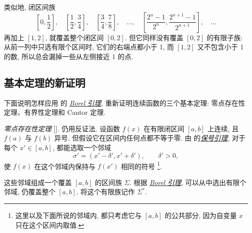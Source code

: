 类似地, 闭区间族
$$
\left[0,\frac12\right],\quad
\left[\frac12,\frac34\right],\quad
\left[\frac34,\frac78\right],\quad\ldots,\quad
\left[\frac{2^n-1}{2^n},\frac{2^{n+1}-1}{2^{n+1}}\right],\quad\ldots
$$
再加上 $[1,2]$, 就覆盖整个闭区间 $[0,2]$.
但它同样没有覆盖 $[0,2]$ 的有限子族:
从前一列中只选有限个区间时, 它们的右端点都小于 1,
而 $[1,2]$ 又不包含小于 1 的数, 所以总会漏掉一些从左侧接近 1 的点.

\subsection{基本定理的新证明}\label{subsec:89}
下面说明怎样应用  的 \hyperref[lem:borel_finite_cover]{\emph{Borel 引理}},
重新证明连续函数的三个基本定理: 零点存在性定理、有界性定理和 Cantor 定理.

\myrefparagraph{1\textdegree}\label{proof:borel_zero_existence}
\emph{零点存在性定理} [].
仍用反证法. 设函数 $f(x)$ 在有限闭区间 $[a,b]$ 上连续,
且 $f(a)$ 与 $f(b)$ 异号, 但假设它在区间内任何点都不等于零.
由  的\hyperref[lem:continuous_sign_preservation]{\emph{保号引理}},
对于每个 $x'\in[a,b]$, 都能选取一个邻域
$$
\sigma'=(x'-\delta',x'+\delta'),\qquad \delta'>0,
$$
使 $f(x)$ 在这个邻域内保持与 $f(x')$ 相同的符号
\footnote{这里以及下面所说的邻域内, 都只考虑它与 $[a,b]$ 的公共部分,
因为自变量 $x$ 只在这个区间内取值.}.

这些邻域组成一个覆盖 $[a,b]$ 的区间族 $\Sigma$.
根据 \hyperref[lem:borel_finite_cover]{\emph{Borel 引理}}, 可以从中选出有限个邻域, 仍覆盖整个 $[a,b]$.
将这个有限族记作 $\Sigma^*$.

